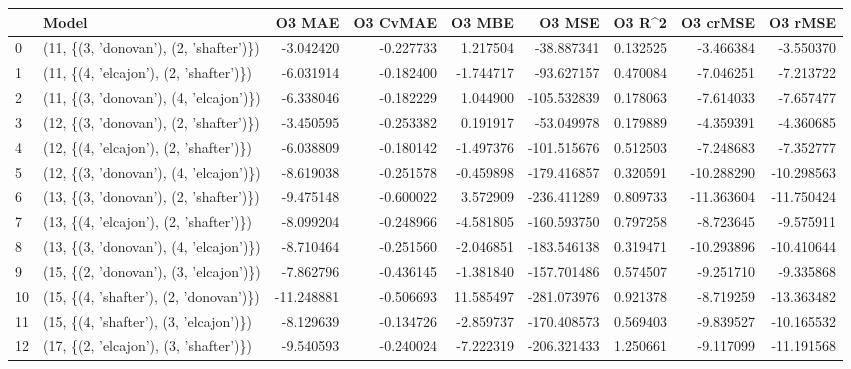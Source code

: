 \begin{tabular}{llrrrrrrr}
\toprule
{} &                                   Model &     O3 MAE &  O3 CvMAE &     O3 MBE &      O3 MSE &    O3 R\textasciicircum2 &   O3 crMSE &    O3 rMSE \\
\midrule
0  &  (11, \{(3, 'donovan'), (2, 'shafter')\}) &  -3.042420 & -0.227733 &   1.217504 &  -38.887341 &  0.132525 &  -3.466384 &  -3.550370 \\
1  &  (11, \{(4, 'elcajon'), (2, 'shafter')\}) &  -6.031914 & -0.182400 &  -1.744717 &  -93.627157 &  0.470084 &  -7.046251 &  -7.213722 \\
2  &  (11, \{(3, 'donovan'), (4, 'elcajon')\}) &  -6.338046 & -0.182229 &   1.044900 & -105.532839 &  0.178063 &  -7.614033 &  -7.657477 \\
3  &  (12, \{(3, 'donovan'), (2, 'shafter')\}) &  -3.450595 & -0.253382 &   0.191917 &  -53.049978 &  0.179889 &  -4.359391 &  -4.360685 \\
4  &  (12, \{(4, 'elcajon'), (2, 'shafter')\}) &  -6.038809 & -0.180142 &  -1.497376 & -101.515676 &  0.512503 &  -7.248683 &  -7.352777 \\
5  &  (12, \{(3, 'donovan'), (4, 'elcajon')\}) &  -8.619038 & -0.251578 &  -0.459898 & -179.416857 &  0.320591 & -10.288290 & -10.298563 \\
6  &  (13, \{(3, 'donovan'), (2, 'shafter')\}) &  -9.475148 & -0.600022 &   3.572909 & -236.411289 &  0.809733 & -11.363604 & -11.750424 \\
7  &  (13, \{(4, 'elcajon'), (2, 'shafter')\}) &  -8.099204 & -0.248966 &  -4.581805 & -160.593750 &  0.797258 &  -8.723645 &  -9.575911 \\
8  &  (13, \{(3, 'donovan'), (4, 'elcajon')\}) &  -8.710464 & -0.251560 &  -2.046851 & -183.546138 &  0.319471 & -10.293896 & -10.410644 \\
9  &  (15, \{(2, 'donovan'), (3, 'elcajon')\}) &  -7.862796 & -0.436145 &  -1.381840 & -157.701486 &  0.574507 &  -9.251710 &  -9.335868 \\
10 &  (15, \{(4, 'shafter'), (2, 'donovan')\}) & -11.248881 & -0.506693 &  11.585497 & -281.073976 &  0.921378 &  -8.719259 & -13.363482 \\
11 &  (15, \{(4, 'shafter'), (3, 'elcajon')\}) &  -8.129639 & -0.134726 &  -2.859737 & -170.408573 &  0.569403 &  -9.839527 & -10.165532 \\
12 &  (17, \{(2, 'elcajon'), (3, 'shafter')\}) &  -9.540593 & -0.240024 &  -7.222319 & -206.321433 &  1.250661 &  -9.117099 & -11.191568 \\

\end{tabular}
